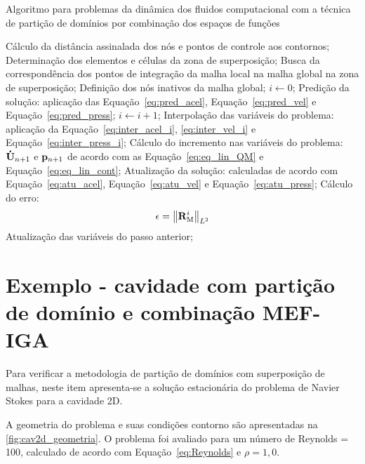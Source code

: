 \begin{algorithm}
	\caption{Algoritmo para problemas da dinâmica dos fluidos computacional com a técnica de partição de domínios por combinação dos espaços de funções}
	\label{alg:overlap}
	\begin{algorithmic}[1]
		\State Cálculo da distância assinalada dos nós e pontos de controle aos contornos;
		\State Determinação dos elementos e células da zona de superposição;
		\State Busca da correspondência dos pontos de integração da malha local na malha global na zona de superposição;
		\State Definição dos nós inativos da malha global;
		\State $i \gets 0$;
		\State Predição da solução: aplicação das Equação~\eqref{eq:pred_acel}, Equação~\eqref{eq:pred_vel} e Equação~\eqref{eq:pred_press};
		\State $i \gets i+1$;
		\State Interpolação das variáveis do problema: aplicação da Equação~\eqref{eq:inter_acel_i}, \autoref {eq:inter_vel_i} e Equação~\eqref{eq:inter_press_i};
		\State Cálculo do incremento nas variáveis do problema: $\mathbf{\dot{U}}_{n+1}$ e $\mathbf{p}_{n+1}$ de acordo com as Equação~\eqref{eq:eq_lin_QM} e Equação~\eqref{eq:eq_lin_cont};
		\State Atualização da solução: calculadas de acordo com Equação~\eqref{eq:atu_acel}, Equação~\eqref{eq:atu_vel} e Equação~\eqref{eq:atu_press};
		\State Cálculo do erro:
		\begin{align}
			\epsilon =\left\| \mathbf{R}_\mathrm{M}^i \right\|_{L^2}
		\end{align}
		\EndWhile
		\State Atualização das variáveis do passo anterior;
		\EndFor
	\end{algorithmic}
\end{algorithm}

\section{Exemplo - cavidade com partição de domínio e combinação MEF-IGA} \label{capitulo:cap5:Exemplo}

Para verificar a metodologia de partição de domínios com superposição de malhas, neste item apresenta-se a solução estacionária do problema de Navier Stokes para a cavidade 2D.

A geometria do problema e suas condições contorno são apresentadas na \autoref{fig:cav2d_geometria}. O problema foi avaliado para um número de Reynolds = 100, calculado de acordo com Equação~\eqref{eq:Reynolds} e $\rho = 1,0$.

